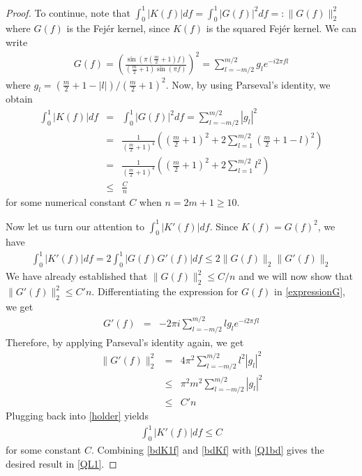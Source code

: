 \begin{proof}
To continue, note that $\int_0^1 | K ( f) | d  f = \int_0^1 | G ( f) |^2 d
 f =: \|G(f)\|_2^2$ where $G ( f)$ is the Fej\'er kernel, since $K(f)$ is the squared
Fej\'er kernel. We can write
\begin{eqnarray}
  G ( f)  =  \left( \frac{\sin \left( \pi \left( \frac{m}{2} + 1 \right) f
  \right)}{\left( \frac{m}{2} + 1 \right) \sin ( \pi f)} \right)^2
   =  \sum_{l = - m / 2}^{m / 2} g_l e^{- i 2 \pi f l}\label{expressionG}
\end{eqnarray}
where $g_l = \left( \frac{m}{2} + 1 - | l | \right) / \left( \frac{m}{2} + 1
\right)^2$. Now, by using Parseval's identity, we obtain
\begin{eqnarray}
 \int_0^1 |K(f)| df & = & \int_0^1 | G ( f) |^2 d f
  =  \sum_{l = - m / 2}^{m / 2} | g_l |^2\nonumber\\
  & = & \frac{1}{\left( \frac{m}{2} + 1 \right)^4} \left( \left( \frac{m}{2}
  + 1 \right)^2 + 2 \sum_{l = 1}^{m / 2} \left( \frac{m}{2} + 1 - l \right)^2
  \right)\nonumber\\
  & = & \frac{1}{\left( \frac{m}{2} + 1 \right)^4} \left( \left( \frac{m}{2}
  + 1 \right)^2 + 2 \sum_{l = 1}^{m / 2} l^2 \right)\nonumber\\
  & \leq & \frac{C}{n}\label{bdKf}
\end{eqnarray}
for some numerical constant $C$ when $n = 2 m + 1 \geq 10$.

Now let us turn our attention to $\int_0^1 | K' (
f) | d  f$. Since $K ( f) = G ( f)^2$, we have
\begin{eqnarray}
  \int_0^1 | K' ( f) | d  f  =  2\int_0^1 | G ( f) G' ( f) | d
   f
   \leq  2\| G ( f) \|_2 \| G' ( f) \|_2\label{holder}
\end{eqnarray}
We have already established that $\| G ( f) \|_2^2 \leq C / {n}$ and we
will now show that $\| G' ( f) \|_2^2 \leq C' {n}$. Differentiating the
expression for $G(f)$ in \eqref{expressionG}, we get
\begin{eqnarray*}
  G' ( f) & = & -2 \pi i \sum_{l = - m / 2}^{m / 2} l g_l e^{- i 2 \pi f l}
\end{eqnarray*}
Therefore, by applying Parseval's identity again, we get
\begin{eqnarray*}
  \| G' ( f) \|_2^2 
  & = & 4 \pi^2 \sum_{l = - m / 2}^{m / 2} l^2 | g_l |^2\\
  & \leq &  \pi^2 m^2 \sum_{l = - m / 2}^{m / 2} | g_l |^2\\
  & \leq & C' n
\end{eqnarray*}
Plugging back into \eqref{holder} yields
\begin{align}
\int_0^1 |K'(f)| df \leq C \label{bdK1f}
\end{align}
for some constant $C$. Combining \eqref{bdK1f} and \eqref{bdKf} with \eqref{Q1bd} gives the desired result in \eqref{QL1}.




\end{proof}
